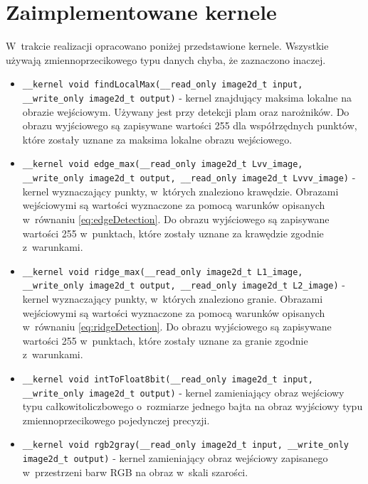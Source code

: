 \chapter{Zaimplementowane kernele}
\label{cha:kernele}

W~trakcie realizacji opracowano poniżej przedstawione kernele. Wszystkie używają zmiennoprzecikowego typu danych chyba, że zaznaczono inaczej.

\begin{itemize}
\item 
\texttt{\_\_kernel void findLocalMax(\_\_read\_only image2d\_t input, \_\_write\_only image2d\_t output)} - kernel znajdujący maksima lokalne na obrazie wejściowym. Używany jest przy detekcji plam oraz narożników. Do obrazu wyjściowego są zapisywane wartości 255 dla współrzędnych punktów, które zostały uznane za maksima lokalne obrazu wejściowego.

\item 
\texttt{\_\_kernel void  edge\_max(\_\_read\_only image2d\_t Lvv\_image, \_\_write\_only image2d\_t output, \_\_read\_only image2d\_t Lvvv\_image)} - kernel wyznaczający punkty, w~których znaleziono krawędzie. Obrazami wejściowymi są wartości wyznaczone za pomocą warunków opisanych w~równaniu \eqref{eq:edgeDetection}. Do obrazu wyjściowego są zapisywane wartości 255 w~punktach, które zostały uznane za krawędzie zgodnie z~warunkami.

\item 
\texttt{\_\_kernel void  ridge\_max(\_\_read\_only image2d\_t L1\_image, \_\_write\_only image2d\_t output, \_\_read\_only image2d\_t L2\_image)} - kernel wyznaczający punkty, w~których znaleziono granie. Obrazami wejściowymi są wartości wyznaczone za pomocą warunków opisanych w~równaniu \eqref{eq:ridgeDetection}. Do obrazu wyjściowego są zapisywane wartości 255 w~punktach, które zostały uznane za granie zgodnie z~warunkami.

\item 
\texttt{\_\_kernel void  intToFloat8bit(\_\_read\_only image2d\_t input, \_\_write\_only image2d\_t output)} - kernel zamieniający obraz wejściowy typu całkowitoliczbowego o~rozmiarze jednego bajta na obraz wyjściowy typu zmiennoprzecikowego pojedynczej precyzji.

\item 
\texttt{\_\_kernel void rgb2gray(\_\_read\_only image2d\_t input, \_\_write\_only image2d\_t output)} - kernel zamieniający obraz wejściowy zapisanego w~przestrzeni barw RGB na obraz w~skali szarości.


\end{itemize}
